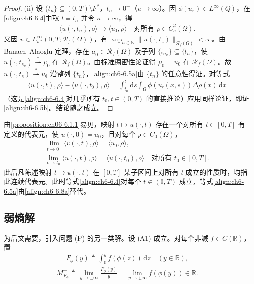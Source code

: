 \documentclass[../../main.tex]{subfiles}%
\begin{document}
\begin{proof}
(ii) 设 $\{t_n\}\subseteq(0,T)\setminus F^*$，$t_n\to0^+$（$n\to\infty$）。因 $\phi(u_r)\in L^\infty(Q)$，在\eqref{align:ch6-6.4}中取 $t=t_n$ 并令 $n\to\infty$，得
\begin{align*}
\langle u(\cdot,t_n),\rho\rangle\to\langle u_0,\rho\rangle
\quad\text{对所有 }\rho\in C^2_c(\Omega).
\end{align*}
又因 $u\in L^\infty_{w^*}(0,T;\mathscr{R}_f(\Omega))$，有 $\sup_{n\in\mathbb{N}}\|u(\cdot,t_n)\|_{\mathscr{R}_f(\Omega)}<\infty$。由 Banach--Alaoglu 定理，存在 $\mu_0\in\mathscr{R}_f(\Omega)$ 及子列 $\{t_{n_k}\}\subseteq\{t_n\}$，使 $u(\cdot,t_{n_k})\stackrel{*}{\rightharpoonup}\mu_0$ 在 $\mathscr{R}_f(\Omega)$。由标准稠密性论证得 $\mu_0=u_0$ 在 $\mathscr{R}_f(\Omega)$。故 $u(\cdot,t_n)\stackrel{*}{\rightharpoonup}u_0$ 沿整列 $\{t_n\}$，\eqref{align:ch6-6.5a}由 $\{t_n\}$ 的任意性得证。对等式
\begin{align*}
\langle u(\cdot,t),\rho\rangle-\langle u(\cdot,t_0),\rho\rangle
= \int_{t_0}^t\mathrm{d}s\int_\Omega\phi(u_r(x,s))\Delta\rho(x)\,\mathrm{d}x
\end{align*}
（这是\eqref{align:ch6-6.4}对几乎所有 $t_0,t\in(0,T)$ 的直接推论）应用同样论证，即证\eqref{align:ch6-6.5b}。结论随之成立。
\end{proof}

\begin{remark}\label{remark:ch06-6.1.2}
由\cref{proposition:ch06-6.1.1}易见，映射 $t\mapsto u(\cdot,t)$ 存在一个对所有 $t\in[0,T]$ 有定义的代表元，使 $u(\cdot,0)=u_0$，且对每个 $\rho\in C_0(\Omega)$，
\begin{align}
\lim_{t\to0^+}\langle u(\cdot,t),\rho\rangle=\langle u_0,\rho\rangle, \label{align:ch6-6.8a}\\
\lim_{t\to t_0}\langle u(\cdot,t),\rho\rangle=\langle u(\cdot,t_0),\rho\rangle
\quad\text{对所有 }t_0\in[0,T]. \label{align:ch6-6.8b}
\end{align}
此后凡陈述映射 $t\mapsto u(\cdot,t)$ 在 $[0,T]$ 某子区间上对所有 $t$ 成立的性质时，均指此连续代表元。此时等式\eqref{align:ch6-6.4}对每个 $t\in(0,T)$ 成立，等式\eqref{align:ch6-6.5a}由\eqref{align:ch6-6.8a}替代。
\end{remark}

\subsection{弱熵解}\label{subsection:ch06-弱熵解}

为后文需要，引入问题 (P) 的另一类解。设 (A1) 成立。对每个非减 $f\in C(\mathbb{R})$，置
\begin{align}
F_\phi(y)\triangleq \int_0^y f(\phi(z))\,\mathrm{d}z \quad(y\in\mathbb{R}), \label{align:ch6-6.9}
\end{align}
\begin{align}
M^\pm_{F_\phi}\triangleq \lim_{y\to\pm\infty}\frac{F_\phi(y)}{y}
=\lim_{y\to\pm\infty}f(\phi(y))\in\mathbb{R}. \label{align:ch6-6.10}
\end{align}
\end{document}
